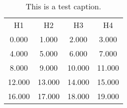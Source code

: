 \begin{table}
\centering
\caption{This is a test caption.\label{tab:matrix}}
\begin{tabular}{cccc}
H1 & H2 & H3 & H4\\
0.000 & 1.000 & 2.000 & 3.000\\
4.000 & 5.000 & 6.000 & 7.000\\
8.000 & 9.000 & 10.000 & 11.000\\
12.000 & 13.000 & 14.000 & 15.000\\
16.000 & 17.000 & 18.000 & 19.000\\
\end{tabular}
\end{table}
